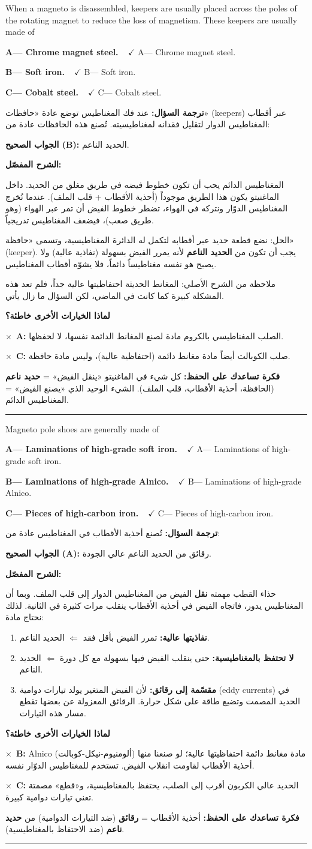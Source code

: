 \documentclass[11pt,a4paper]{article}
\newcommand{\en}[1]{\textenglish{#1}}
\newcommand{\correctletter}{}
\newcommand{\opt}[2]{%
  \ifdefstring{\correctletter}{#1}%
    {\textcolor{ansgreen}{\textbf{#1— #2\ \ $\checkmark$}}}%
    {#1— #2}\par}
\newcommand{\Q}[6]{%
  \renewcommand{\correctletter}{#6}%
  \par\bigskip
  \phantomsection\label{q#1}%
  \begin{tcolorbox}[enhanced,breakable,colback=qback,colframe=qframe,
      arc=2mm,boxrule=0.8pt,fonttitle=\bfseries,
      title={\en{Question #1}}]
    \begin{english}
      #2\par\smallskip
      \opt{A}{#3}\opt{B}{#4}\opt{C}{#5}
    \end{english}
  \end{tcolorbox}}
\newcommand{\tr}[1]{\textbf{\textcolor{qframe}{ترجمة السؤال:}} #1\par}
\newcommand{\ans}[2]{%
  \begin{tcolorbox}[colback=ansback,colframe=ansgreen,boxrule=0.6pt,arc=1.5mm,
      left=4pt,right=4pt,top=2pt,bottom=2pt]
    \textbf{\textcolor{ansgreen}{الجواب الصحيح (\en{#1}):}} #2
  \end{tcolorbox}}
\newcommand{\sharh}[1]{\textbf{\textcolor{conceptc}{الشرح المفصّل:}}\par #1\par}
\newcommand{\nohead}{\textbf{\textcolor{wrongc}{لماذا الخيارات الأخرى خاطئة؟}}\par}
\newcommand{\no}[2]{\hspace*{1em}\textcolor{wrongc}{$\times$}\ \textbf{\en{#1}:} #2\par}
\newcommand{\tip}[1]{%
  \begin{tcolorbox}[colback=tipback,colframe=tipframe,boxrule=0.5pt,arc=1.5mm,
      left=4pt,right=4pt,top=2pt,bottom=2pt]
    \textbf{فكرة تساعدك على الحفظ:} #1
  \end{tcolorbox}}
\newcommand{\qsep}{\par\medskip\noindent\textcolor{qframe!40}{\rule{\linewidth}{0.4pt}}\par}
\begin{document}
\Q{8503}{When a magneto is disassembled, keepers are usually placed across the poles of the rotating magnet to reduce the loss of magnetism. These keepers are usually made of}
{Chrome magnet steel.}
{Soft iron.}
{Cobalt steel.}{B}
\tr{عند فك المغناطيس توضع عادة «حافظات» (\en{keepers}) عبر أقطاب المغناطيس الدوار لتقليل فقدانه لمغناطيسيته. تُصنع هذه الحافظات عادة من:}
\ans{B}{الحديد الناعم.}
\sharh{المغناطيس الدائم يحب أن تكون خطوط فيضه في طريق مغلق من الحديد. داخل الماغنيتو يكون هذا الطريق موجوداً (أحذية الأقطاب + قلب الملف). عندما نُخرج المغناطيس الدوّار ونتركه في الهواء، تضطر خطوط الفيض أن تمر عبر الهواء (وهو طريق صعب)، فيضعف المغناطيس تدريجياً.

الحل: نضع قطعة حديد عبر أقطابه لتكمل له الدائرة المغناطيسية، وتسمى «حافظة» (\en{keeper}). يجب أن تكون من \textbf{الحديد الناعم} لأنه يمرر الفيض بسهولة (نفاذية عالية) ولا يصبح هو نفسه مغناطيساً دائماً، فلا يشوّه أقطاب المغناطيس.

ملاحظة من الشرح الأصلي: المغانط الحديثة احتفاظيتها عالية جداً، فلم تعد هذه المشكلة كبيرة كما كانت في الماضي، لكن السؤال ما زال يأتي.}
\nohead
\no{A}{الصلب المغناطيسي بالكروم مادة لصنع المغانط الدائمة نفسها، لا لحفظها.}
\no{C}{صلب الكوبالت أيضاً مادة مغانط دائمة (احتفاظية عالية)، وليس مادة حافظة.}
\tip{كل شيء في الماغنيتو «ينقل الفيض» = \textbf{حديد ناعم} (الحافظة، أحذية الأقطاب، قلب الملف). الشيء الوحيد الذي «يصنع الفيض» = المغناطيس الدائم.}
\qsep

\Q{8517}{Magneto pole shoes are generally made of}
{Laminations of high-grade soft iron.}
{Laminations of high-grade Alnico.}
{Pieces of high-carbon iron.}{A}
\tr{تُصنع أحذية الأقطاب في المغناطيس عادة من:}
\ans{A}{رقائق من الحديد الناعم عالي الجودة.}
\sharh{حذاء القطب مهمته \textbf{نقل} الفيض من المغناطيس الدوار إلى قلب الملف. وبما أن المغناطيس يدور، فاتجاه الفيض في أحذية الأقطاب ينقلب مرات كثيرة في الثانية. لذلك نحتاج مادة:
\begin{enumerate}[label=\arabic*.]
  \item \textbf{نفاذيتها عالية:} تمرر الفيض بأقل فقد $\Leftarrow$ الحديد الناعم.
  \item \textbf{لا تحتفظ بالمغناطيسية:} حتى ينقلب الفيض فيها بسهولة مع كل دورة $\Leftarrow$ الحديد الناعم.
  \item \textbf{مقسّمة إلى رقائق:} لأن الفيض المتغير يولد تيارات دوامية (\en{eddy currents}) في الحديد المصمت وتضيع طاقة على شكل حرارة. الرقائق المعزولة عن بعضها تقطع مسار هذه التيارات.
\end{enumerate}}
\nohead
\no{B}{\en{Alnico} (ألومنيوم-نيكل-كوبالت) مادة مغانط دائمة احتفاظيتها عالية؛ لو صنعنا منها أحذية الأقطاب لقاومت انقلاب الفيض. تستخدم للمغناطيس الدوّار نفسه.}
\no{C}{الحديد عالي الكربون أقرب إلى الصلب، يحتفظ بالمغناطيسية، و«قطع» مصمتة تعني تيارات دوامية كبيرة.}
\tip{أحذية الأقطاب = \textbf{رقائق} (ضد التيارات الدوامية) من \textbf{حديد ناعم} (ضد الاحتفاظ بالمغناطيسية).}
\qsep
\end{document}
